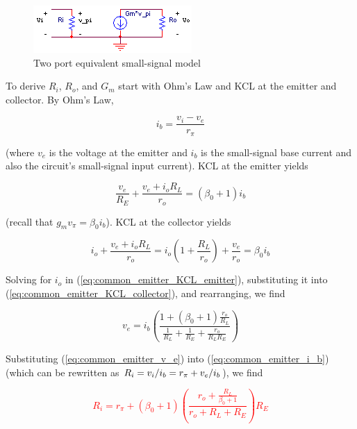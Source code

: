 \begin{figure}
	\centering
		\includegraphics{schematics/twoport_ss_model.PNG}
	\caption{Two port equivalent small-signal model}
	\label{fig:twoport_ss_model}
\end{figure}
\par
To derive $R_{i}$, $R_{o}$, and $G_{m}$ start with Ohm's Law and KCL at the emitter and collector. By Ohm's Law,

\begin{equation}
i_{b} = \frac{v_{i}-v_{e}}{r_{\pi}}
\label{eq:common_emitter_i_b}
\end{equation}

\noindent (where $v_{e}$ is the voltage at the emitter and $i_{b}$ is the small-signal base current and also the circuit's small-signal input current). KCL at the emitter yields

\begin{equation}
\frac{v_{e}}{R_{E}} + \frac{v_{e}+i_{o}R_{L}}{r_{o}} = (\beta_{0}+1)i_{b}
\label{eq:common_emitter_KCL_emitter}
\end{equation}

\noindent (recall that $g_{m}v_{\pi} = \beta_{0}i_{b}$). KCL at the collector yields

\begin{equation}
i_{o} + \frac{v_{e}+i_{o}R_{L}}{r_{o}} = i_{o}\left(1 + \frac{R_{L}}{r_{o}}\right) + \frac{v_{e}}{r_{o}} = \beta_{0}i_{b}
\label{eq:common_emitter_KCL_collector}
\end{equation}

\noindent Solving for $i_{o}$ in (\ref{eq:common_emitter_KCL_emitter}), substituting it into (\ref{eq:common_emitter_KCL_collector}), and rearranging, we find

\begin{equation}
v_{e} = i_{b}\left(\frac{1+(\beta_{0}+1)\frac{r_{o}}{R_{L}}}{\frac{1}{R_{L}} + \frac{1}{R_{E}} + \frac{r_{o}}{R_{L}R_{E}}}\right)
\label{eq:common_emitter_v_e}
\end{equation}

Substituting (\ref{eq:common_emitter_v_e}) into (\ref{eq:common_emitter_i_b}) (which can be rewritten as $R_{i} = v_i/i_b = r_{\pi} + v_e/i_b$), we find \autocite[197-199]{analysis-design-analog-ics}

\textcolor{red}{
\begin{equation}
R_{i} = r_{\pi} + (\beta_{0}+1)\left(\frac{r_{o} + \frac{R_{L}}{\beta_{0}+1}}{r_{o} + R_{L} + R_{E}}\right)R_{E}
\label{eq:common_emitter_Ri}
\end{equation}
}

